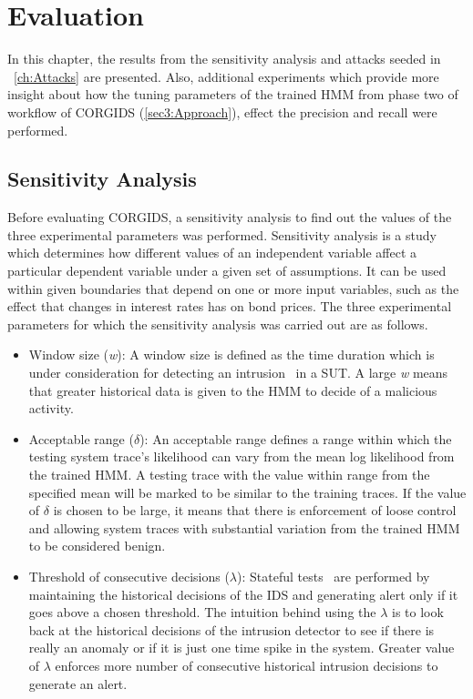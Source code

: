 
\chapter{\textbf{Evaluation}}
\label{sec6:Evaluation}
In this chapter, the results from the sensitivity analysis and attacks seeded in ~\autoref{ch:Attacks} are presented. Also, additional experiments which provide more insight about how the tuning parameters of the trained HMM from phase two of workflow of \ac{CORGIDS} (\autoref{sec3:Approach}), effect the precision and recall were performed.

\section{Sensitivity Analysis}
\label{sensitivityAnalysis}

Before evaluating \ac{CORGIDS}, a sensitivity analysis to find out the values of the three experimental parameters was performed. Sensitivity analysis is a study which determines how different values of an independent variable affect a particular dependent variable under a given set of assumptions. It can be used within given boundaries that depend on one or more input variables, such as the effect that changes in interest rates has on bond prices. The three experimental parameters for which the sensitivity analysis was carried out are as follows.

\begin{itemize}
\item Window size (\textit{w}): A window size is defined as the time duration which is under consideration for detecting an intrusion~\cite{zohrevand2016hidden} in a \ac{SUT}. A large \textit{w} means that greater historical data is given to the \ac{HMM} to decide of a malicious activity.
\item Acceptable range ($\delta$): An acceptable range defines a range within which the testing system trace's likelihood can vary from the mean log likelihood from the trained \ac{HMM}. A testing trace with the value within range from the specified mean will be marked to be similar to the training traces. If the value of $\delta$ is chosen to be large, it means that there is enforcement of loose control and allowing system traces with substantial variation from the trained \ac{HMM} to be considered benign.
\item Threshold of consecutive decisions ($\lambda$): Stateful tests~\cite{urbina2016limiting} are performed by maintaining the historical decisions of the \ac{IDS} and generating alert only if it goes above a chosen threshold. The intuition behind using the $\lambda$ is to look back at the historical decisions of the intrusion detector to see if there is really an anomaly or if it is just one time spike in the system. Greater value of $\lambda$ enforces more number of consecutive historical intrusion decisions to generate an alert.
\end{itemize}

